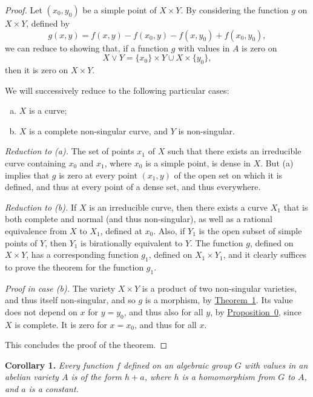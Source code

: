 \documentclass{article}
\newenvironment{itenv}[1]
  {\phantomsection\par\medskip\noindent\textbf{#1.}\itshape}
  {\medskip}
\newcommand{\oldpage}[1]{\marginpar{\footnotesize$\Big\vert$ \textit{p.~#1}}}
\begin{document}
\oldpage{9-05}
\begin{proof}
  Let $(x_0,y_0)$ be a simple point of $X\times Y$.
  By considering the function $g$ on $X\times Y$, defined by
  \[
    g(x,y) = f(x,y) - f(x_0,y) - f(x,y_0) + f(x_0,y_0),
  \]
  we can reduce to showing that, if a function $g$ with values in $A$ is zero on
  \[
    X\vee Y = \{x_0\}\times Y \cup X\times\{y_0\},
  \]
  then it is zero on $X\times Y$.

  We will successively reduce to the following particular cases:
  \begin{enumerate}[(a)]
    \item $X$ is a curve;
    \item $X$ is a complete non-singular curve, and $Y$ is non-singular.
  \end{enumerate}

  \emph{Reduction to (a).}
  The set of points $x_1$ of $X$ such that there exists an irreducible curve containing $x_0$ and $x_1$, where $x_0$ is a simple point, is dense in $X$.
  But (a) implies that $g$ is zero at every point $(x_1,y)$ of the open set on which it is defined, and thus at every point of a dense set, and thus everywhere.

  \emph{Reduction to (b).}
  If $X$ is an irreducible curve, then there exists a curve $X_1$ that is both complete and normal (and thus non-singular), as well as a rational equivalence from $X$ to $X_1$, defined at $x_0$.
  Also, if $Y_1$ is the open subset of simple points of $Y$, then $Y_1$ is birationally equivalent to $Y$.
  The function $g$, defined on $X\times Y$, has a corresponding function $g_1$, defined on $X_1\times Y_1$, and it clearly suffices to prove the theorem for the function $g_1$.

  \emph{Proof in case (b).}
  The variety $X\times Y$ is a product of two non-singular varieties, and thus itself non-singular, and so $g$ is a morphism, by \hyperref[theorem1]{Theorem~1}.
  Its value does not depend on $x$ for $y=y_0$, and thus also for all $y$, by \hyperref[proposition0]{Proposition~0}, since $X$ is complete.
  It is zero for $x=x_0$, and thus for all $x$.

  This concludes the proof of the theorem.
\end{proof}

\begin{itenv}{Corollary 1}
\label{corollary1}
  Every function $f$ defined on an algebraic group $G$ with values in an abelian variety $A$ is of the form $h+a$, where $h$ is a homomorphism from $G$ to $A$, and $a$ is a constant.
\end{itenv}
\end{document}
